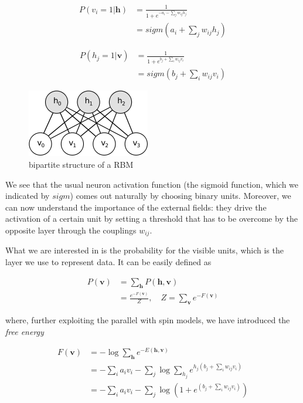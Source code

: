 \documentclass{revtex4-1}
\begin{document}
\begin{align}
P(v_i = 1 | \textbf{h}) &  = \frac{1}{1+e^{-a_i - \sum_{j} w_{ij} h_j}} \nonumber \\
& = sigm \left(a_i + \sum_{j} w_{ij} h_j \right)
\label{eq:act_vis}
\end{align}

\begin{align}
P(h_j = 1 | \textbf{v}) & = \frac{1}{1+e^{b_j + \sum_i w_{ij} v_i}} \nonumber \\
& = sigm \left(b_j + \sum_i w_{ij} v_i \right)
\label{eq:act_hid}
\end{align}

\begin{figure}
  \centering
  \includegraphics{rbm.png}
  \caption{bipartite structure of a RBM}
  \label{fig:rbm}
\end{figure}

We see that the usual neuron activation function (the sigmoid function, which we indicated by \(sigm\)) comes out naturally by choosing binary units. Moreover, we can now understand the importance of the external fields: they drive the activation of a certain unit by setting a threshold that has to be overcome by the opposite layer through the couplings \(w_{ij}\).

What we are interested in is the probability for the visible units, which is the layer we use to represent data. It can be easily defined as

\begin{align}
P(\textbf{v}) &  = \sum_{\textbf{h}} P(\textbf{h},\textbf{v}) \nonumber \\
& = \frac{e^{-F(\textbf{v})}}{Z}, \quad Z = \sum_{\textbf{v}} e^{-F(\textbf{v})}
\label{eq:p_model}
\end{align}

where, further exploiting the parallel with spin models, we have introduced the \textit{free energy}

\begin{align}
F(\textbf{v}) & = -\log \sum_{\textbf{h}} e^{-E(\textbf{h},\textbf{v})} \nonumber \\
& = -\sum_i a_i v_i -\sum_j \log \sum_{h_j} e^{h_j \left( b_j + \sum_i w_{ij} v_i \right)} \nonumber \\
& = -\sum_i a_i v_i -\sum_j \log \left( 1 +  e^{\left( b_j + \sum_i w_{ij} v_i \right)} \right)
\end{align}
\end{document}
